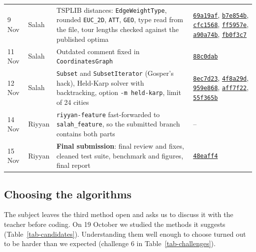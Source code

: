 \documentclass[10pt,a4paper]{article}
\newcommand{\commit}[1]{\href{https://github.com/riyyan-ahmed/TSP-Solver-Project/commit/#1}{\texttt{#1}}}
\begin{document}
{\begin{xltabular}{\linewidth}{@{}l l Y L{3.2cm}@{}}
9 Nov & Salah & TSPLIB distances: \texttt{EdgeWeightType}, rounded \texttt{EUC\_2D}, \texttt{ATT}, \texttt{GEO}, type read from the file, tour lengths checked against the published optima & \commit{69a19af}, \commit{b7e854b}, \commit{cfc1568}, \commit{ff5957e}, \commit{a90a74b}, \commit{fb0f3c7} \\
11 Nov & Salah & Outdated comment fixed in \texttt{CoordinatesGraph} & \commit{88c0dab} \\
12 Nov & Salah & \texttt{Subset} and \texttt{SubsetIterator} (Gosper's hack), Held-Karp solver with backtracking, option \texttt{-m held-karp}, limit of 24 cities & \commit{8ec7d23}, \commit{4f8a29d}, \commit{959e868}, \commit{aff7f22}, \commit{55f365b} \\
14 Nov & Riyyan & \texttt{riyyan-feature} fast-forwarded to \texttt{salah\_feature}, so the submitted branch contains both parts & -- \\
15 Nov & Riyyan & \textbf{Final submission}: final review and fixes, cleaned test suite, benchmark and figures, final report & \commit{48eaff4} \\
\end{xltabular}}

\subsection{Choosing the algorithms}\label{sec-choice}

The subject leaves the third method open and asks us to discuss it with the teacher before coding. On 19 October we studied the methods it suggests (Table~\ref{tab-candidates}). Understanding them well enough to choose turned out to be harder than we expected (challenge 6 in Table~\ref{tab-challenges}).
\end{document}
